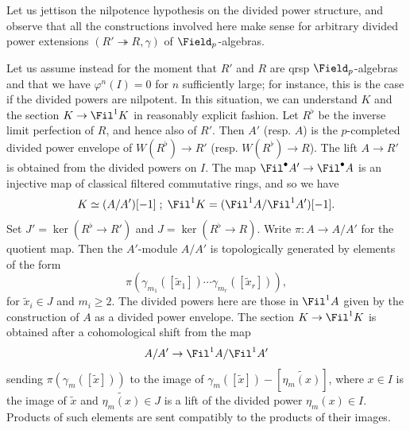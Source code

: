 \documentclass[10pt]{amsart}
\begin{document}
\begin{remark}
\label{rem:nnn_qrsp_case}
Let us jettison the nilpotence hypothesis on the divided power structure, and observe that all the constructions involved here make sense for arbitrary divided power extensions $(R'\twoheadrightarrow R,\gamma)$ of $\Field_p$-algebras. 

Let us assume instead for the moment that $R'$ and $R$ are qrsp $\Field_p$-algebras and that we have $\varphi^n(I) = 0$ for $n$ sufficiently large; for instance, this is the case if the divided powers are nilpotent.  In this situation, we can understand $K$ and the section $K\to \Fil^1K$ in reasonably explicit fashion. Let $R^\flat$ be the inverse limit perfection of $R$, and hence also of $R'$. Then $A'$ (resp. $A$) is the $p$-completed divided power envelope of $W(R^\flat)\to R'$ (resp. $W(R^\flat)\to R$). The lift $A\to R'$ is obtained from the divided powers on $I$. The map $\Fil^\bullet A'\to \Fil^\bullet A$ is an injective map of classical filtered commutative rings, and so we have 
\[
K\simeq (A/A')[-1]\;;\;\Fil^1K = (\Fil^1A/\Fil^1A')[-1].
\]
Set $J' = \ker(R^\flat\to R')$ and $J = \ker(R^\flat\to R)$. Write $\pi:A\to A/A'$ for the quotient map. Then the $A'$-module $A/A'$ is topologically generated by elements of the form
\[
\pi(\gamma_{m_1}([\tilde{x}_1])\cdots\gamma_{m_r}([\tilde{x}_r])), 
\]
for $\tilde{x}_i\in J$ and $m_i\ge 2$. The divided powers here are those in $\Fil^1A$ given by the construction of $A$ as a divided power envelope. The section $K\to \Fil^1K$ is obtained after a cohomological shift from the map
\begin{align}\label{eqn:divided_power_section_explicit}
A/A' \to \Fil^1A/\Fil^1A'
\end{align}
sending $\pi(\gamma_m([\tilde{x}]))$ to the image of $\gamma_m([\tilde{x}]) - [\widetilde{\eta_m(x)}]$, where $x\in I$ is the image of $\tilde{x}$ and $\widetilde{\eta_m(x)}\in J$ is a lift of the divided power $\eta_m(x)\in I$. Products of such elements are sent compatibly to the products of their images.
\end{remark}
\end{document}
